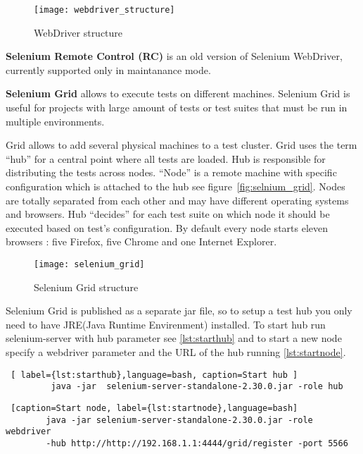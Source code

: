 	    \begin{figure}
		\label{fig:webdriver}
		\texttt{[image: webdriver\_structure]}
		\caption{WebDriver structure}
		\end{figure}
		
    	\textbf{Selenium Remote Control (RC)} is an old version of Selenium
    	WebDriver, currently supported only in maintanance mode.
       
       \textbf{Selenium Grid} allows to execute tests on different machines.
       Selenium Grid is useful for projects with large amount of tests or test
       suites that must be run in multiple environments.
       
		Grid allows to add several physical machines to a test cluster. Grid uses the
		term ``hub'' for a central point where all tests are loaded. Hub is responsible
		for distributing the tests across nodes. ``Node'' is  a remote machine with
		specific configuration which is attached to the hub see
		figure~\ref{fig:selnium_grid}. Nodes are totally separated from each other and
		may have different operating systems and browsers. Hub ``decides''
		for each test suite on which node it should be executed based on test's configuration.
		By default every node starts eleven browsers : five Firefox, five Chrome and
		one Internet Explorer.
		
		\begin{figure}
		\label{fig:webdriver}
		\texttt{[image: selenium\_grid]}
		\caption{Selenium Grid structure}
		\end{figure}
		
		Selenium Grid is published as a separate jar file, so to setup a test hub you
		only need to have JRE(Java Runtime Envirenment) installed. To start hub run
		selenium-server with hub parameter see \ref{lst:starthub} and to start a new
		node specify a webdriver parameter and the URL of the hub running \ref{lst:startnode}.
		
		\begin{lstlisting} [ label={lst:starthub},language=bash, caption=Start hub ]
		 java -jar	selenium-server-standalone-2.30.0.jar -role hub
		\end{lstlisting}

		\begin{lstlisting} [caption=Start node, label={lst:startnode},language=bash]
		java -jar selenium-server-standalone-2.30.0.jar -role webdriver
		-hub http://http://192.168.1.1:4444/grid/register -port 5566
		\end{lstlisting}
		

